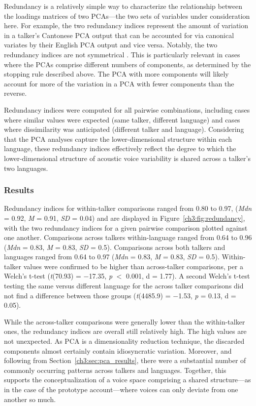 Redundancy is a relatively simple way to characterize the relationship between the loadings matrices of two PCAs---the two sets of variables under consideration here. For example, the two redundancy indices represent the amount of variation in a talker's Cantonese PCA output that can be accounted for via canonical variates by their English PCA output and vice versa. Notably, the two redundancy indices are not symmetrical \citep{stewart_1968_canonical}. This is particularly relevant in cases where the PCAs comprise different numbers of components, as determined by the stopping rule described above. The PCA with more components will likely account for more of the variation in a PCA with fewer components than the reverse.

Redundancy indices were computed for all pairwise combinations, including cases where similar values were expected (same talker, different language) and cases where dissimilarity was anticipated (different talker and language). Considering that the PCA analyses capture the lower-dimensional structure within each language, these redundancy indices effectively reflect the degree to which the lower-dimensional structure of acoustic voice variability is shared across a talker's two languages.

\subsubsection{Results}

Redundancy indices for within-talker comparisons ranged from 0.80 to 0.97, (\textit{Mdn} = 0.92, \textit{M} = 0.91, \textit{SD} = 0.04) and are displayed in Figure~\ref{ch3:fig:redundancy}, with the two redundancy indices for a given pairwise comparison plotted against one another. Comparisons across talkers within-language ranged from 0.64 to 0.96 (\textit{Mdn} = 0.83, \textit{M} = 0.83, \textit{SD} = 0.5). Comparisons across both talkers and languages ranged from 0.64 to 0.97 (\textit{Mdn} = 0.83, \textit{M} = 0.83, \textit{SD} = 0.5). Within-talker values were confirmed to be higher than across-talker comparisons, per a Welch's t-test (\textit{t}(70.93) = $-$17.35, \textit{p} $<$ 0.001, d = 1.77). A second Welch's t-test testing the same versus different language for the across talker comparisons did not find a difference between those groups (\textit{t}(4485.9) = $-$1.53, \textit{p} = 0.13, d = 0.05). 

While the across-talker comparisons were generally lower than the within-talker ones, the redundancy indices are overall still relatively high. The high values are not unexpected. As PCA is a dimensionality reduction technique, the discarded components almost certainly contain idiosyncratic variation. Moreover, and following from Section~\ref{ch3:sec:pca_results}, there were a substantial number of commonly occurring patterns across talkers and languages. Together, this supports the conceptualization of a voice space comprising a shared structure---as in the case of the prototype account---where voices can only deviate from one another so much.

